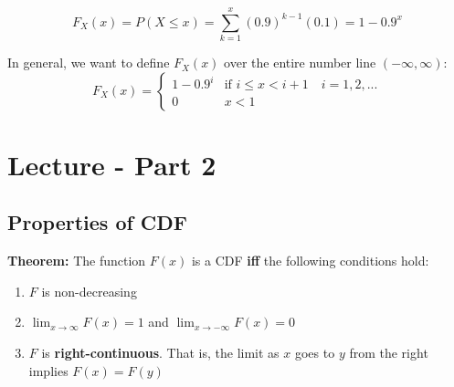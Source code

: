 \documentclass{article}
\begin{document}
\begin{equation*}
    F_X(x) = P(X\leq x) = \sum\limits_{k=1}^x (0.9)^{k-1}(0.1) = 1-0.9^x
\end{equation*}

In general, we want to define $F_X(x)$ over the entire number line $(-\infty, \infty)$:
\begin{equation*}
F_X(x) = \begin{cases}
1-0.9^i & \text{if } i \leq x < i+1 \quad i = 1,2,...\\
0 & x < 1
\end{cases}
\end{equation*}

\section{Lecture - Part 2}

\subsection{Properties of CDF}
\textbf{Theorem:} The function $F(x)$ is a CDF \textbf{iff} the following conditions hold:
\begin{enumerate}
    \item $F$ is non-decreasing
    \item $\lim_{x\to\infty} F(x) = 1$ and $\lim_{x\to-\infty} F(x) = 0$
    \item $F$ is \textbf{right-continuous}. That is, the limit as $x$ goes to $y$ from the right implies $F(x) = F(y)$ 
\end{enumerate}
\end{document}
